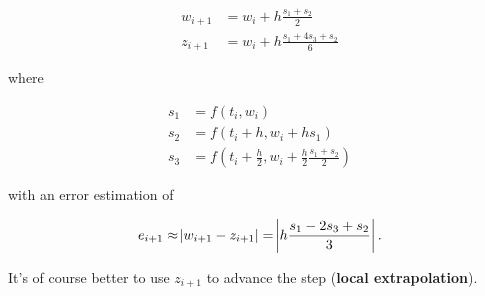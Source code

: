 \begin{align*}
w_{i+1} &= w_i + h \frac{s_1 +s_2}{2} \\
z_{i+1} &= w_i + h \frac{s_1 + 4s_3 + s_2}{6}
\end{align*}

where

\begin{align*}
    s_1 &= f(t_i,w_i) \\
    s_2 &= f(t_i + h,w_i + hs_1) \\
    s_3 &= f(t_i + \frac{h}{2},w_i + \frac{h}{2}\frac{s_1 + s_2}{2})
\end{align*}

with an error estimation of

$$
e_{i+1} \approx \abs{w_{i+1} - z_{i+1}} = \abs{h\frac{s_1 - 2s_3 + s_2}{3}}.
$$

It's of course better to use $z_{i+1}$ to advance the step (\textbf{local extrapolation}).